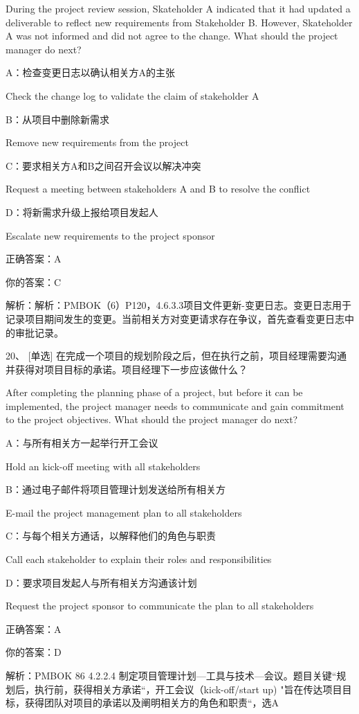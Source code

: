 During the project review session, Skateholder A indicated that it had updated a deliverable to reflect new requirements from Stakeholder B. However, Skateholder A was not informed and did not agree to the change. What should the project manager do next?

A：检查变更日志以确认相关方A的主张

Check the change log to validate the claim of stakeholder A

B：从项目中删除新需求

Remove new requirements from the project

C：要求相关方A和B之间召开会议以解决冲突

Request a meeting between stakeholders A and B to resolve the conflict

D：将新需求升级上报给项目发起人

Escalate new requirements to the project sponsor

正确答案：A

你的答案：C

解析：解析：PMBOK（6）P120，4.6.3.3项目文件更新-变更日志。变更日志用于记录项目期间发生的变更。当前相关方对变更请求存在争议，首先查看变更日志中的审批记录。

20、 [单选] 在完成一个项目的规划阶段之后，但在执行之前，项目经理需要沟通并获得对项目目标的承诺。项目经理下一步应该做什么？

After completing the planning phase of a project, but before it can be implemented, the project manager needs to communicate and gain commitment to the project objectives. What should the project manager do next?

A：与所有相关方一起举行开工会议

Hold an kick-off meeting with all stakeholders

B：通过电子邮件将项目管理计划发送给所有相关方

E-mail the project management plan to all stakeholders

C：与每个相关方通话，以解释他们的角色与职责

Call each stakeholder to explain their roles and responsibilities

D：要求项目发起人与所有相关方沟通该计划

Request the project sponsor to communicate the plan to all stakeholders

正确答案：A

你的答案：D

解析：PMBOK 86 4.2.2.4 制定项目管理计划—工具与技术—会议。题目关键“规划后，执行前，获得相关方承诺“，开工会议（kick-off/start up) "旨在传达项目目标，获得团队对项目的承诺以及阐明相关方的角色和职责“，选A

